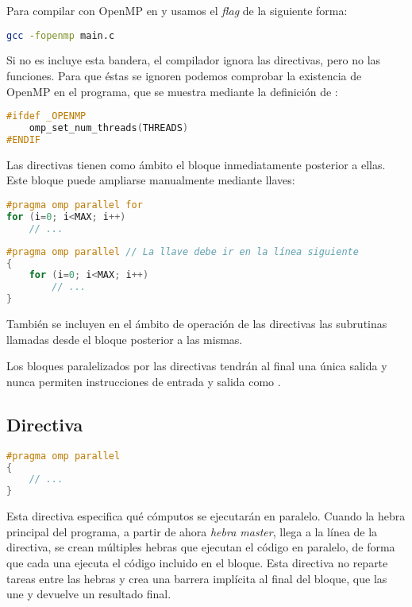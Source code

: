 Para compilar con OpenMP en  y  usamos el \textit{flag}  de la siguiente forma:

\begin{lstlisting}[language=sh]
gcc -fopenmp main.c
\end{lstlisting}

Si no es incluye esta bandera, el compilador ignora las directivas, pero no las funciones.
Para que éstas se ignoren podemos comprobar la existencia de OpenMP en el programa, que se muestra mediante la definición de :

\begin{lstlisting}[language=C]
#ifdef _OPENMP
	omp_set_num_threads(THREADS)
#ENDIF
\end{lstlisting}

Las directivas tienen como ámbito el bloque inmediatamente posterior a ellas.
Este bloque puede ampliarse manualmente mediante llaves:

\begin{lstlisting}[language=C]
#pragma omp parallel for
for (i=0; i<MAX; i++)
	// ...
\end{lstlisting}

\begin{lstlisting}[language=C]
#pragma omp parallel // La llave debe ir en la línea siguiente
{
	for (i=0; i<MAX; i++)
		// ...
}
\end{lstlisting}

También se incluyen en el ámbito de operación de las directivas las subrutinas llamadas desde el bloque posterior a las mismas.

Los bloques paralelizados por las directivas tendrán al final una única salida y nunca permiten instrucciones de entrada y salida como .

\subsection{Directiva }\label{directivas-openmp-directivas-parallel}

\begin{lstlisting}[language=C]
#pragma omp parallel
{
	// ...
}
\end{lstlisting}

Esta directiva especifica qué cómputos se ejecutarán en paralelo.
Cuando la hebra principal del programa, a partir de ahora \textit{hebra master}, llega a la línea de la directiva, se crean múltiples hebras que ejecutan el código en paralelo, de forma que cada una ejecuta el código incluido en el bloque.
Esta directiva no reparte tareas entre las hebras y crea una barrera implícita al final del bloque, que las une y devuelve un resultado final.

